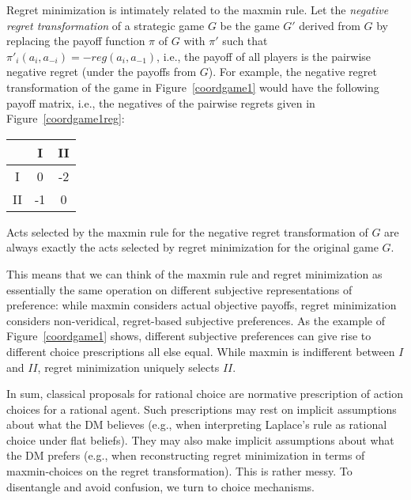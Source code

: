 \documentclass[fleqn,reqno,11pt]{article}
\begin{document}

  

Regret minimization is intimately related to the maxmin rule. Let the \emph{negative regret
  transformation} of a strategic game $G$ be the game $G'$ derived from $G$ by replacing the payoff
function $\pi$ of $G$ with $\pi'$ such that $\pi'_i(a_i, a_{-i}) = - reg(a_i,a_{-1})$, i.e.,
the payoff of all players is the pairwise negative regret (under the payoffs from $G$). For
example, the negative regret transformation of the game in Figure~\ref{coordgame1} would have the
following payoff matrix, i.e., the negatives of the pairwise regrets given in
Figure~\ref{coordgame1reg}:

\begin{center}
    \begin{tabular}{ccc}
      \toprule
      & I & II \\
      \midrule
      I & 0 & -2 \\
      II & -1 & 0\\
      \bottomrule
    \end{tabular}
\end{center}

\noindent Acts selected by the maxmin rule for the negative regret transformation of $G$ are
always exactly the acts selected by regret minimization for the original game $G$.

This means that we can think of the maxmin rule and regret minimization as essentially the same
operation on different subjective representations of preference: while maxmin considers actual
objective payoffs, regret minimization considers non-veridical, regret-based subjective
preferences. As the example of Figure~\ref{coordgame1} shows, different subjective preferences
can give rise to different choice prescriptions all else equal. While maxmin is indifferent
between $I$ and $II$, regret minimization uniquely selects $II$.

In sum, classical proposals for rational choice are normative prescription of action choices
for a rational agent. Such prescriptions may rest on implicit assumptions about what the DM
believes (e.g., when interpreting Laplace's rule as rational choice under flat beliefs). They may
also make implicit assumptions about what the DM prefers (e.g., when reconstructing regret
minimization in terms of maxmin-choices on the regret transformation). This is rather messy. To
disentangle and avoid confusion, we turn to choice mechanisms.
\end{document}
